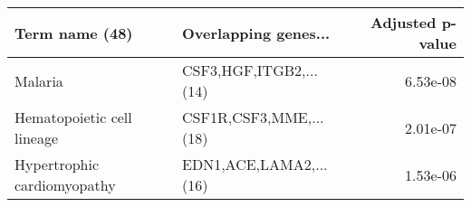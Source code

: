 \begin{tabular}{llr}
\toprule
             Term name (48) &   Overlapping genes... &  Adjusted p-value \\
\midrule
                    Malaria & CSF3,HGF,ITGB2,...(14) &          6.53e-08 \\
 Hematopoietic cell lineage & CSF1R,CSF3,MME,...(18) &          2.01e-07 \\
Hypertrophic cardiomyopathy & EDN1,ACE,LAMA2,...(16) &          1.53e-06 \\
\bottomrule
\end{tabular}
